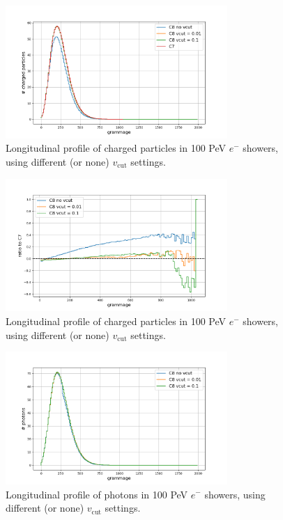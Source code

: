 \documentclass[aspectratio=1610, 9pt]{beamer}
\begin{document}
\begin{frame}
            \begin{figure}
                \centering
                \includegraphics[width=0.75\textwidth]{plots/v_analysis_charged.png}
                \caption{Longitudinal profile of charged particles in 100 PeV $e^-$ showers, using different (or none) $v_\text{cut}$ settings.}
            \end{figure}
\end{frame}

\begin{frame}
            \begin{figure}
                \centering
                \includegraphics[width=0.75\textwidth]{plots/v_analysis_charged_ratio.png}
                \caption{Longitudinal profile of charged particles in 100 PeV $e^-$ showers, using different (or none) $v_\text{cut}$ settings.}
            \end{figure}
\end{frame}

\begin{frame}
            \begin{figure}
                \centering
                \includegraphics[width=0.75\textwidth]{plots/v_analysis_photon.png}
                \caption{Longitudinal profile of photons in 100 PeV $e^-$ showers, using different (or none) $v_\text{cut}$ settings.}
            \end{figure}
\end{frame}
\end{document}
